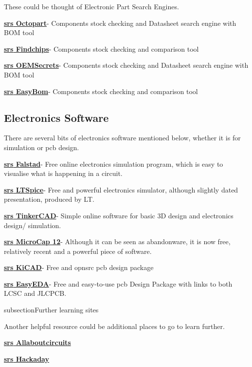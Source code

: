 \documentclass[a4paper,11pt]{report}
\let\oldhref\href %
\renewcommand{\href}[2]{\oldhref{#1}{\bf\gls{srs} #2}}
\begin{document}
These could be thought of Electronic Part Search Engines.

\href{https://octopart.com/}{Octopart}- Components stock checking and Datasheet search engine with BOM tool

\href{https://www.findchips.com/}{Findchips}- Components stock checking and comparison tool

\href{https://www.oemsecrets.com/}{OEMSecrets}- Components stock checking and Datasheet search engine with BOM tool

\href{https://www.easybom.com/}{EasyBom}- Components stock checking and comparison tool

\vspace*{1\baselineskip}

\subsection{Electronics Software}

There are several bits of electronics software mentioned below, whether it is for simulation or \gls{pcb} design.

\href{https://www.falstad.com/circuit/}{Falstad}- Free online electronics simulation program, which is easy to visualise what is happening in a circuit.

\href{https://www.analog.com/en/design-center/design-tools-and-calculators/lt\gls{spi}ce-simulator.html}{LTSpice}- Free and powerful electronics simulator, although slightly dated presentation, produced by LT.

\href{https://www.tinkercad.com/}{TinkerCAD}- Simple online software for basic 3D design and electronics design/ simulation.

\href{http://www.spectrum-soft.com/download/download.shtm}{MicroCap 12}- Although it can be seen as abandonware, it is now free, relatively recent and a powerful piece of software.

\href{https://www.kicad.org/}{KiCAD}- Free and \gls{opnsrc} \gls{pcb} design package

\href{https://easyeda.com/}{EasyEDA}- Free and easy-to-use \gls{pcb} Design Package with links to both LCSC and JLCPCB.

subsection{Further learning sites}

Another helpful resource could be additional places to go to learn further.

\href{https://www.allaboutcircuits.com/}{Allaboutcircuits}

\href{https://hackaday.com/}{Hackaday}
\end{document}
